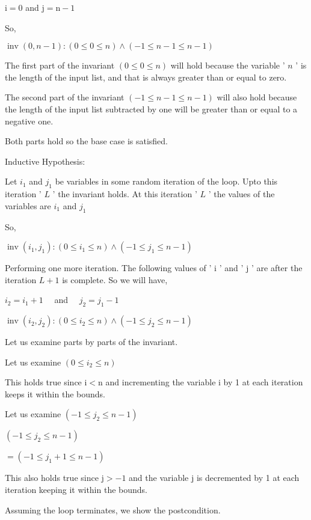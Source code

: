 \documentclass[10pt]{article}
\begin{document}
$\mathrm{i}=0$ and $\mathrm{j}=\mathrm{n}-1$

So,

$\operatorname{inv}(0, n-1):(0 \leq 0 \leq n) \wedge(-1 \leq n-1 \leq n-1)$

The first part of the invariant $(0 \leq 0 \leq n)$ will hold because the variable ' $n$ ' is the length of the input list, and that is always greater than or equal to zero.

The second part of the invariant $(-1 \leq n-1 \leq n-1)$ will also hold because the length of the input list subtracted by one will be greater than or equal to a negative one.

Both parts hold so the base case is satisfied.

Inductive Hypothesis:

Let $i_{1}$ and $j_{1}$ be variables in some random iteration of the loop. Upto this iteration ' $L$ ' the invariant holds. At this iteration ' $L$ ' the values of the variables are $i_{1}$ and $j_{1}$

So,

$\operatorname{inv}\left(i_{1}, j_{1}\right):\left(0 \leq i_{1} \leq n\right) \wedge\left(-1 \leq j_{1} \leq n-1\right)$

Performing one more iteration. The following values of ' $\mathrm{i}$ ' and ' $\mathrm{j}$ ' are after the iteration $L+1$ is complete. So we will have,

$i_{2}=i_{1}+1 \quad$ and $\quad j_{2}=j_{1}-1$

$\operatorname{inv}\left(i_{2}, j_{2}\right):\left(0 \leq i_{2} \leq n\right) \wedge\left(-1 \leq j_{2} \leq n-1\right)$

Let us examine parts by parts of the invariant.

Let us examine $\left(0 \leq i_{2} \leq n\right)$


This holds true since $\mathrm{i}<\mathrm{n}$ and incrementing the variable $\mathrm{i}$ by 1 at each iteration keeps it within the bounds.

Let us examine $\left(-1 \leq j_{2} \leq n-1\right)$

$\left(-1 \leq j_{2} \leq n-1\right)$

$=\left(-1 \leq j_{1}+1 \leq n-1\right)$

This also holds true since $\mathrm{j}>-1$ and the variable $\mathrm{j}$ is decremented by 1 at each iteration keeping it within the bounds.

Assuming the loop terminates, we show the postcondition.
\end{document}
